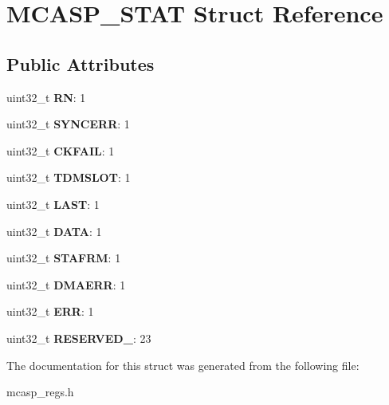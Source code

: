 \hypertarget{structMCASP__STAT}{\section{M\-C\-A\-S\-P\-\_\-\-S\-T\-A\-T Struct Reference}
\label{structMCASP__STAT}
}
\subsection*{Public Attributes}
\begin{DoxyCompactItemize}
\item 
\hypertarget{structMCASP__STAT_aadbe7cc2e562c19d7b24bc77e1325de0}{uint32\-\_\-t {\bfseries R\-N}\-: 1}\label{structMCASP__STAT_aadbe7cc2e562c19d7b24bc77e1325de0}

\item 
\hypertarget{structMCASP__STAT_a7588ae6850b6b4f9e86ba1c10cf2bd6f}{uint32\-\_\-t {\bfseries S\-Y\-N\-C\-E\-R\-R}\-: 1}\label{structMCASP__STAT_a7588ae6850b6b4f9e86ba1c10cf2bd6f}

\item 
\hypertarget{structMCASP__STAT_a78d2190c9c4ac6582d3053f1c289efa5}{uint32\-\_\-t {\bfseries C\-K\-F\-A\-I\-L}\-: 1}\label{structMCASP__STAT_a78d2190c9c4ac6582d3053f1c289efa5}

\item 
\hypertarget{structMCASP__STAT_a28f83b4675ca2a78a2ec0d2f21a3f8bb}{uint32\-\_\-t {\bfseries T\-D\-M\-S\-L\-O\-T}\-: 1}\label{structMCASP__STAT_a28f83b4675ca2a78a2ec0d2f21a3f8bb}

\item 
\hypertarget{structMCASP__STAT_a05ec23cfcb1470cc9c5e445ce52dd001}{uint32\-\_\-t {\bfseries L\-A\-S\-T}\-: 1}\label{structMCASP__STAT_a05ec23cfcb1470cc9c5e445ce52dd001}

\item 
\hypertarget{structMCASP__STAT_ab883a174cf38104856a7883b5ccb4a32}{uint32\-\_\-t {\bfseries D\-A\-T\-A}\-: 1}\label{structMCASP__STAT_ab883a174cf38104856a7883b5ccb4a32}

\item 
\hypertarget{structMCASP__STAT_a2ba2d1616a851cb6b5fb93713f6bee2b}{uint32\-\_\-t {\bfseries S\-T\-A\-F\-R\-M}\-: 1}\label{structMCASP__STAT_a2ba2d1616a851cb6b5fb93713f6bee2b}

\item 
\hypertarget{structMCASP__STAT_aaacd057eb38a53a30f6dfae466b81c01}{uint32\-\_\-t {\bfseries D\-M\-A\-E\-R\-R}\-: 1}\label{structMCASP__STAT_aaacd057eb38a53a30f6dfae466b81c01}

\item 
\hypertarget{structMCASP__STAT_ac8d6ba04f7589fe985f8adbd4135f87f}{uint32\-\_\-t {\bfseries E\-R\-R}\-: 1}\label{structMCASP__STAT_ac8d6ba04f7589fe985f8adbd4135f87f}

\item 
\hypertarget{structMCASP__STAT_a5b3b0c02fe04caeba3fc834d5f7c30ad}{uint32\-\_\-t {\bfseries R\-E\-S\-E\-R\-V\-E\-D\-\_}\-: 23}\label{structMCASP__STAT_a5b3b0c02fe04caeba3fc834d5f7c30ad}

\end{DoxyCompactItemize}


The documentation for this struct was generated from the following file\-:\begin{DoxyCompactItemize}
\item 
mcasp\-\_\-regs.\-h\end{DoxyCompactItemize}
